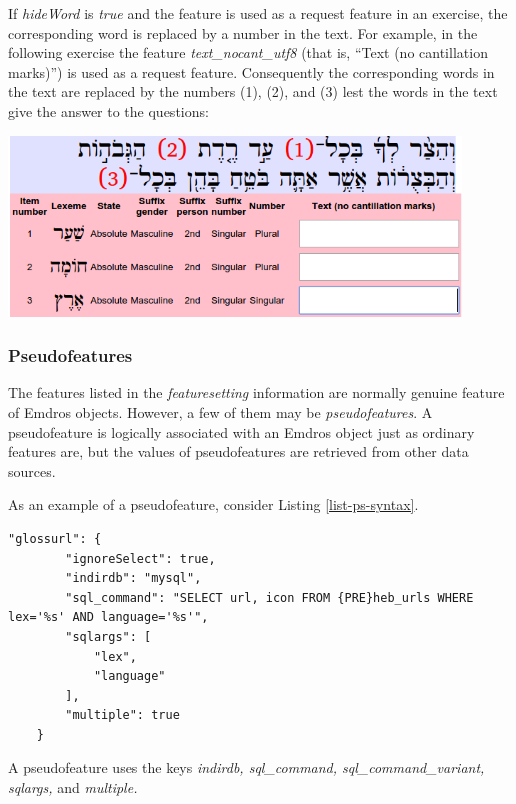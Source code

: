 \documentclass[11pt,oneside,a4paper]{memoir}
\begin{document}
If \emph{hideWord} is \emph{true} and the feature is used as a request feature%
in an exercise, the corresponding word is replaced by a number in the text. For example,
in the following exercise the feature \emph{text\_nocant\_utf8} (that is, ``Text (no cantillation
marks)'') is used as a request feature. Consequently the corresponding words in the text are
replaced by the numbers (1), (2), and (3) lest the words in the text give the answer to the
questions:


\begin{center}
  \includegraphics[width=0.9\textwidth]{numbers.png}
\end{center}

\subsubsection{Pseudofeatures}\label{sec-pseudofeature}

The features listed in the \emph{featuresetting} information are normally genuine feature of Emdros
objects. However, a few of them may be \emph{pseudofeatures}. A pseudofeature is logically
associated with an Emdros object just as ordinary features are, but the values of pseudofeatures are
retrieved from other data sources.

As an example of a pseudofeature, consider Listing \ref{list-ps-syntax}.

\begin{lstlisting}[escapechar=\#,caption=Featuresetting syntax for a pseudofeature,label=list-ps-syntax]
    "glossurl": {
        "ignoreSelect": true,
        "indirdb": "mysql",
        "sql_command": "SELECT url, icon FROM {PRE}heb_urls WHERE lex='%s' AND language='%s'",
        "sqlargs": [
            "lex",
            "language"
        ],
        "multiple": true
    }
\end{lstlisting}

A pseudofeature uses the keys \emph{indirdb, sql\_command, sql\_command\_variant, sqlargs,} and \emph{multiple.}
\end{document}
